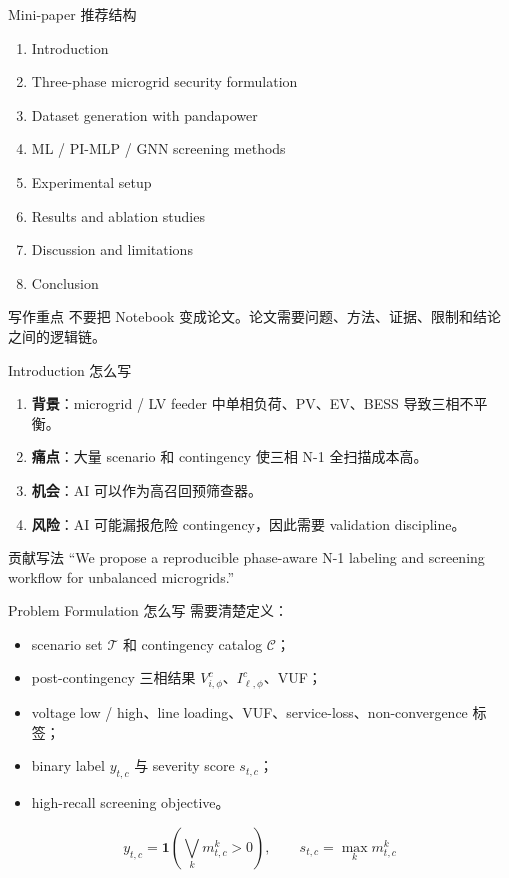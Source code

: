 \documentclass[aspectratio=169,11pt]{beamer}
\begin{document}
\begin{frame}{Mini-paper 推荐结构}
\small
\begin{enumerate}
  \item Introduction
  \item Three-phase microgrid security formulation
  \item Dataset generation with pandapower
  \item ML / PI-MLP / GNN screening methods
  \item Experimental setup
  \item Results and ablation studies
  \item Discussion and limitations
  \item Conclusion
\end{enumerate}
\begin{block}{写作重点}
不要把 Notebook 变成论文。论文需要问题、方法、证据、限制和结论之间的逻辑链。
\end{block}
\end{frame}

\begin{frame}{Introduction 怎么写}
\begin{enumerate}
  \item \textbf{背景}：microgrid / LV feeder 中单相负荷、PV、EV、BESS 导致三相不平衡。
  \item \textbf{痛点}：大量 scenario 和 contingency 使三相 N-1 全扫描成本高。
  \item \textbf{机会}：AI 可以作为高召回预筛查器。
  \item \textbf{风险}：AI 可能漏报危险 contingency，因此需要 validation discipline。
\end{enumerate}
\begin{exampleblock}{贡献写法}
``We propose a reproducible phase-aware N-1 labeling and screening workflow for unbalanced microgrids.''
\end{exampleblock}
\end{frame}

\begin{frame}{Problem Formulation 怎么写}
\small
需要清楚定义：
\begin{itemize}
  \item scenario set $\mathcal{T}$ 和 contingency catalog $\mathcal{C}$；
  \item post-contingency 三相结果 $V_{i,\phi}^c$、$I_{\ell,\phi}^c$、VUF；
  \item voltage low / high、line loading、VUF、service-loss、non-convergence 标签；
  \item binary label $y_{t,c}$ 与 severity score $s_{t,c}$；
  \item high-recall screening objective。
\end{itemize}
\[
y_{t,c} = \mathbf{1}\left(\bigvee_k m_{t,c}^k >0\right),\qquad s_{t,c} = \max_k m_{t,c}^k
\]
\end{frame}
\end{document}
